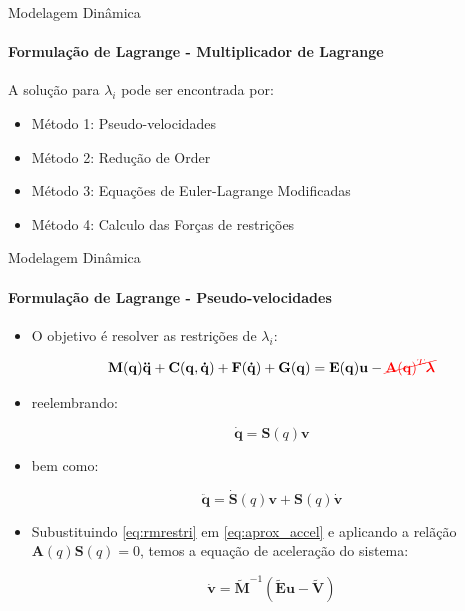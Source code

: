 \documentclass{beamer}
\newcommand{\cmark}{\textcolor{green}{\ding{51}}}%
\newcommand{\xmark}{\textcolor{red}{\ding{55}}}%
\begin{document}
\begin{frame}{Modelagem Dinâmica}
    \framesubtitle{Formulação de Lagrange - Multiplicador de Lagrange}
    A solução para $\lambda_i$ pode ser encontrada por:
    \begin{itemize}
        \item Método 1: Pseudo-velocidades \cmark
        \item Método 2: Redução de Order \xmark
        \item Método 3: Equações de Euler-Lagrange Modificadas \xmark
        \item Método 4: Calculo das Forças de restrições \xmark
    \end{itemize}
\end{frame}


\begin{frame}{Modelagem Dinâmica}
    \framesubtitle{Formulação de Lagrange - Pseudo-velocidades}

    \begin{itemize}
        \item O objetivo é resolver as restrições de $\lambda_i$:

              \begin{equation}\label{eq:rmrestri}
                  \mathbf{M(q)\ddot{q}+ C(q, \dot{q})+ F(\dot{q})+G(q) = E(q)u} - \textcolor{red}{\cancel{\mathbf{A}\mathbf{(q)}^T\boldsymbol{\lambda}}}
              \end{equation}

        \item reelembrando:

              \begin{equation*}
                  \mathbf{\dot{q}} = \mathbf{S}(q)\mathbf{v}
              \end{equation*}

        \item bem como:

              \begin{equation}\label{eq:aprox_accel}
                  \mathbf{\ddot{q}} = \mathbf{\dot{S}}(q)\mathbf{v} + \mathbf{S}(q)\mathbf{\dot{v}}
              \end{equation}

        \item Subustituindo \eqref{eq:rmrestri} em \eqref{eq:aprox_accel} e aplicando a relãção $\mathbf{A}(q)\mathbf{S}(q)=0$, temos a equação de aceleração do sistema:

              \begin{equation}\label{eq:pseudovelo}
                  \mathbf{\dot{v}} = \mathbf{\tilde{M}}^{-1}\left(\mathbf{\tilde{E}u - \tilde{V}} \right)
              \end{equation}
    \end{itemize}
\end{frame}
\end{document}
